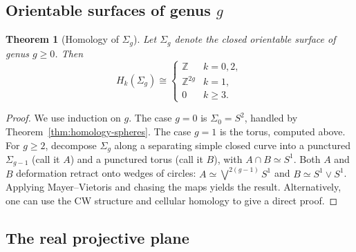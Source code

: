 \documentclass[12pt,a4paper,openany]{book}
\theoremstyle{definition}
\theoremstyle{plain}
\newtheorem{theorem}[definition]{Theorem}
\theoremstyle{remark}
\newcommand{\Z}{\mathbb{Z}}
\begin{document}
\subsection{Orientable surfaces of genus $g$}
\label{subsec:mv-surfaces-g}

\begin{theorem}[Homology of $\Sigma_g$]\label{thm:homology-sigma-g}
Let $\Sigma_g$ denote the closed orientable surface of genus $g\geq 0$.
Then
\[
  H_k(\Sigma_g) \cong
  \begin{cases}
    \Z     & k=0,2,\\
    \Z^{2g} & k=1,\\
    0      & k\geq 3.
  \end{cases}
\]
\end{theorem}

\begin{proof}
We use induction on $g$. The case $g=0$ is $\Sigma_0=S^2$, handled
by Theorem~\ref{thm:homology-spheres}. The case $g=1$ is the torus,
computed above. For $g\geq 2$, decompose $\Sigma_g$ along a separating
simple closed curve into a punctured $\Sigma_{g-1}$ (call it $A$) and
a punctured torus (call it $B$), with $A\cap B\simeq S^1$.
Both $A$ and $B$ deformation retract onto wedges of circles:
$A\simeq\bigvee^{2(g-1)} S^1$ and $B\simeq S^1\vee S^1$.
Applying Mayer--Vietoris and chasing the maps yields the result.
Alternatively, one can use the CW structure and cellular homology
to give a direct proof.
\end{proof}

\subsection{The real projective plane}\label{subsec:mv-rp2}
\end{document}
